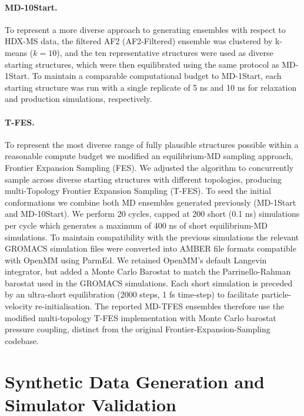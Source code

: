\paragraph{MD-10Start.}
To represent a more diverse approach to generating ensembles with respect to HDX-MS data, the filtered AF2 (AF2-Filtered) ensemble was clustered by k-means ($k=10$), and the ten representative structures were used as diverse starting structures, which were then equilibrated using the same protocol as MD-1Start. To maintain a comparable computational budget to MD-1Start, each starting structure was run with a single replicate of 5 ns and 10 ns for relaxation and production simulations, respectively.

\paragraph{T-FES.}
To represent the most diverse range of fully plausible structures possible within a reasonable compute budget we modified an equilibrium-MD sampling approach, Frontier Expansion Sampling (FES).\supercite{zhangFrontierExpansionSampling2020} We adjusted the algorithm to concurrently sample across diverse starting structures with different topologies, producing multi-Topology Frontier Expansion Sampling (T-FES). To seed the initial conformations we combine both MD ensembles generated previously (MD-1Start and MD-10Start). We perform 20 cycles, capped at 200 short (0.1 ns) simulations per cycle which generates a maximum of 400 ns of short equilibrium-MD simulations. To maintain compatibility with the previous simulations the relevant GROMACS simulation files were converted into AMBER file formats compatible with OpenMM using ParmEd.\supercite{shirtsLessonsLearnedComparing2017} We retained OpenMM's default Langevin integrator, but added a Monte Carlo Barostat to match the Parrinello-Rahman barostat used in the GROMACS simulations. Each short simulation is preceded by an ultra-short equilibration (2000 steps, 1 fs time-step) to facilitate particle-velocity re-initialisation. The reported MD-TFES ensembles therefore use the modified multi-topology T-FES implementation with Monte Carlo barostat pressure coupling, distinct from the original Frontier-Expansion-Sampling codebase.

\section{Synthetic Data Generation and Simulator Validation}
\label{app:valdx-synthetic}


